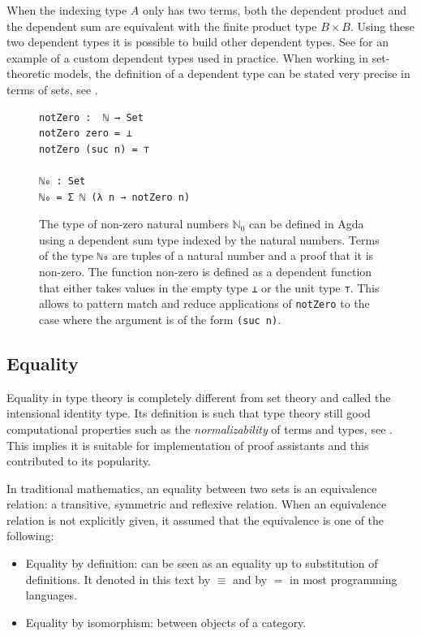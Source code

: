 \documentclass[12pt,a4paper,twoside,xetex]{book} %
\newcommand{\keyword}[1]{\emph{#1}\index{#1}}
\begin{document}
When the indexing type $A$ only has two terms, both the dependent product and the dependent sum 
are equivalent with the finite product type $B \times B$. Using these two 
dependent types it is possible to build other dependent types. See 
 for an example of a custom dependent types used in practice. 
When working in set-theoretic models, the definition of a dependent type can be 
stated very precise in terms of sets, see .

\begin{figure}\label{non-zeroNats}
\centering
\begin{BVerbatim}
notZero :  ℕ → Set
notZero zero = ⊥
notZero (suc n) = ⊤

ℕ₀ : Set
ℕ₀ = Σ ℕ (λ n → notZero n)
\end{BVerbatim}
\caption{The type of non-zero natural numbers $\mathbb{N}_0$ can be defined in 
Agda using a dependent sum type indexed by the natural numbers. Terms of the 
type \texttt{ℕ₀} are tuples of a natural number and a proof that it is 
non-zero. The function non-zero is defined as a dependent function that either takes values in the empty type \texttt{⊥} or the unit type \texttt{⊤}. This allows to pattern match and reduce applications of \texttt{notZero} to the case where the argument is of the form \texttt{(suc n)}.}
\end{figure}


\subsection{Equality}


Equality in type theory is completely different from set theory and called the intensional identity type. Its definition is such that type theory still good computational properties such as the \keyword{normalizability} of terms and types, see . This implies it is suitable for implementation of proof assistants and this contributed to its popularity. 

In traditional mathematics, an equality between two sets is an equivalence relation: a transitive, symmetric and reflexive relation. When an equivalence relation is not explicitly given, it assumed that the equivalence is one of the following: 

\begin{itemize}
 \item Equality by definition: can be seen as an equality up to substitution 
of definitions. It denoted in this text by $\equiv$ and by $=$ in most programming languages.
 \item Equality by isomorphism: between objects of a category.
\end{itemize}
\end{document}
